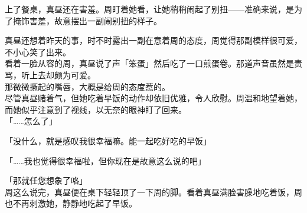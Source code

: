 上了餐桌，真昼还在害羞。周盯着她看，让她稍稍闹起了别扭——准确来说，是为了掩饰害羞，故意摆出一副闹别扭的样子。

真昼还想着昨天的事，时不时露出一副在意着周的态度，周觉得那副模样很可爱，不小心笑了出来。\\

看着一脸从容的周，真昼说了声「笨蛋」然后吃了一口煎蛋卷。那道声音虽然是责骂，听上去却颇为可爱。\\

那微微撅起的嘴唇，大概是给周的态度惹的。\\

尽管真昼赌着气，但她吃着早饭的动作却依旧优雅，令人欣慰。周温和地望着她，而她似乎注意到了视线，以无奈的眼神盯了回来。\\

「……怎么了」

「没什么，就是感叹我很幸福嘛。能一起吃好吃的早饭」

「……我也觉得很幸福啦，但你现在是故意这么说的吧」

「那就任您想象了咯」\\

周这么说完，真昼便在桌下轻轻顶了一下周的脚。看着真昼满脸害臊地吃着饭，周也不再刺激她，静静地吃起了早饭。
